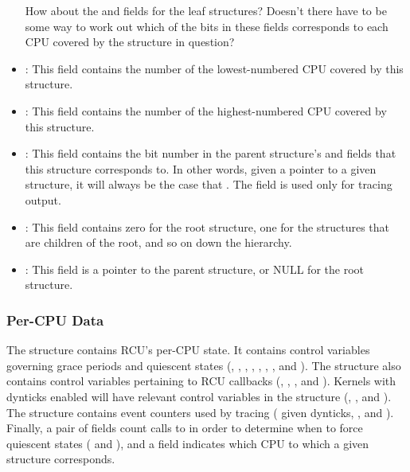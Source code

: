 \begin{itemize}
\QuickQuiz{}
	How about the  and 
	fields for the leaf  structures?
	Doesn't there have to be some way to work out
	which of the bits in these fields corresponds
	to each CPU covered by the  structure
	in question?
 \QuickQuizEnd

\item	{}:
	This field contains the number of the lowest-numbered CPU covered
	by this  structure.
\item	{}:
	This field contains the number of the highest-numbered CPU covered
	by this  structure.
\item	{}:
	This field contains the bit number in the parent 
	structure's  and  fields that this
	 structure corresponds to.
	In other words, given a pointer  to a given
	 structure, it will always be the case that
	.
	The  field is used only for tracing output.
\item	{}:
	This field contains zero for the root  structure,
	one for the  structures that are children of
	the root, and so on down the hierarchy.
\item	{}:
	This field is a pointer to the parent  structure,
	or NULL for the root  structure.
\end{itemize}

\subsubsection{Per-CPU Data}
\label{app:rcuimpl:rcutreewt:Per-CPU Data}

The  structure contains RCU's per-CPU state.
It contains control variables governing grace periods and
quiescent states (, , ,
, , , ,
and ).
The  structure also contains control variables pertaining
to RCU callbacks
(, , , and ).
Kernels with dynticks enabled will have relevant control variables in
the  structure
(, , and ).
The  structure contains event counters used by tracing
( given dynticks, , and ).
Finally, a pair of fields count calls to  in order
to determine when to force quiescent states ( and
), and a  field indicates which
CPU to which a given  structure corresponds.

